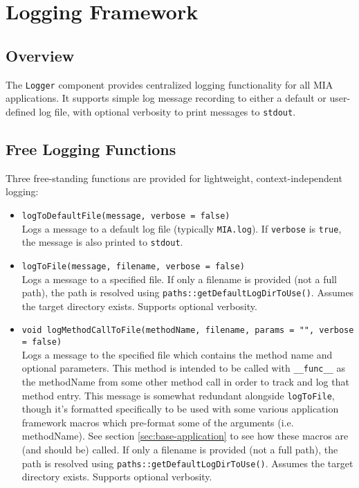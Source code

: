\section{Logging Framework}
\label{sec:logging-Framework}

\subsection{Overview}
The \texttt{Logger} component provides centralized logging functionality for all MIA applications. It supports simple log message recording to either a default or user-defined log file, with optional verbosity to print messages to \texttt{stdout}.

\subsection{Free Logging Functions}
Three free-standing functions are provided for lightweight, context-independent logging:

\begin{itemize}\itemsep0em
	\item \texttt{logToDefaultFile(message, verbose = false)}\\
	Logs a message to a default log file (typically \texttt{MIA.log}). If \texttt{verbose} is \texttt{true}, the message is also printed to \texttt{stdout}.
	
	\item \texttt{logToFile(message, filename, verbose = false)}\\
	Logs a message to a specified file. If only a filename is provided (not a full path), the path is resolved using \texttt{paths::getDefaultLogDirToUse()}. Assumes the target directory exists. Supports optional verbosity.

 	\item \texttt{void logMethodCallToFile(methodName, filename, params = "", verbose = false)}\\
  	Logs a message to the specified file which contains the method name and optional parameters. This method is intended to be called with \texttt{\_\_func\_\_} as the methodName from some other method call in order to track and log that method entry. This message is somewhat redundant alongside \texttt{logToFile}, though it's formatted specifically to be used with some various application framework macros which pre-format some of the arguments (i.e. methodName). See section \ref{sec:base-application} to see how these macros are (and should be) called. If only a filename is provided (not a full path), the path is resolved using \texttt{paths::getDefaultLogDirToUse()}. Assumes the target directory exists. Supports optional verbosity.
\end{itemize}

